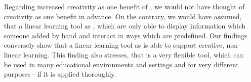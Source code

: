 Regarding increased creativity as one benefit of \AR \appsns, we would not have thought of creativity as one benefit in advance. On the contrary, we would have assumed, that a linear learning tool as \AR \appsns, which are only able to display information which someone added by hand and interact in ways which are predefined. Our findings conversely show that a linear learning tool as \AR \apps is able to support creative, non-linear learning. This finding also stresses, that \AR is a very flexible tool, which can be used in many educational environments and settings and for very different purposes - if it is applied thoroughly. %
\\

